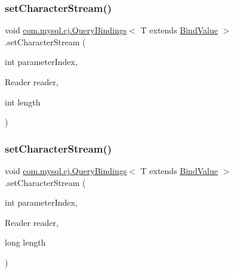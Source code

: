 \subsubsection{\texorpdfstring{set\+Character\+Stream()}{setCharacterStream()}\hspace{0.1cm}{\footnotesize\ttfamily [2/3]}}
{\footnotesize\ttfamily void \mbox{\hyperlink{interfacecom_1_1mysql_1_1cj_1_1_query_bindings}{com.\+mysql.\+cj.\+Query\+Bindings}}$<$ T extends \mbox{\hyperlink{interfacecom_1_1mysql_1_1cj_1_1_bind_value}{Bind\+Value}} $>$.set\+Character\+Stream (\begin{DoxyParamCaption}\item[{int}]{parameter\+Index,  }\item[{Reader}]{reader,  }\item[{int}]{length }\end{DoxyParamCaption})}

\mbox{\label{interfacecom_1_1mysql_1_1cj_1_1_query_bindings_af4d619fe54e4d6b4354a9fa91ba1d198}} 
\subsubsection{\texorpdfstring{set\+Character\+Stream()}{setCharacterStream()}\hspace{0.1cm}{\footnotesize\ttfamily [3/3]}}
{\footnotesize\ttfamily void \mbox{\hyperlink{interfacecom_1_1mysql_1_1cj_1_1_query_bindings}{com.\+mysql.\+cj.\+Query\+Bindings}}$<$ T extends \mbox{\hyperlink{interfacecom_1_1mysql_1_1cj_1_1_bind_value}{Bind\+Value}} $>$.set\+Character\+Stream (\begin{DoxyParamCaption}\item[{int}]{parameter\+Index,  }\item[{Reader}]{reader,  }\item[{long}]{length }\end{DoxyParamCaption})}

\mbox{\label{interfacecom_1_1mysql_1_1cj_1_1_query_bindings_a4238c9057d5f6e2dff678d434a22531e}} 

